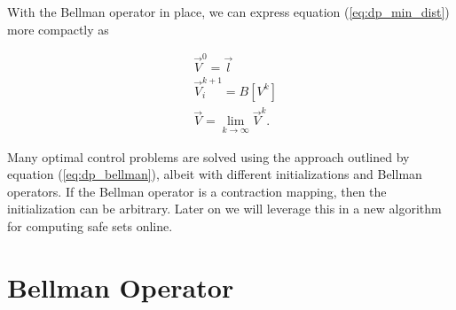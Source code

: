 \documentclass[letterpaper, 10 pt, conference]{ieeeconf}
\begin{document}
With the Bellman operator in place, we can express equation (\ref{eq:dp_min_dist}) more compactly as

\begin{subequations}\label{eq:dp_bellman}
\begin{align}
&\vec{V}^{0} = \vec{l}\\
&\vec{V}_{i}^{k+1} = B[V^k] \\
&\vec{V} = \lim_{k\rightarrow \infty} \vec{V}^{k}.
\end{align}
\end{subequations}

Many optimal control problems are solved using the approach outlined by equation (\ref{eq:dp_bellman}), albeit with different initializations and Bellman operators. If the Bellman operator is a contraction mapping, then the initialization can be arbitrary. Later on we will leverage this in a new algorithm for computing safe sets online. 

\section{Bellman Operator}
\end{document}

